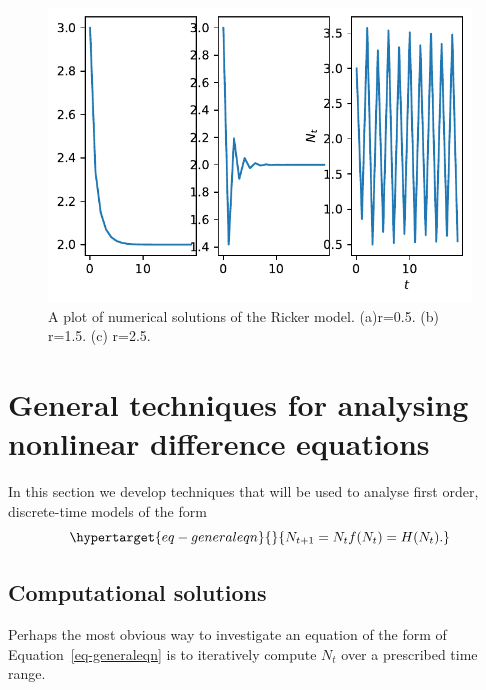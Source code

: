 \documentclass[
  letterpaper,
  DIV=11,
  numbers=noendperiod]{scrreprt}
\begin{document}
\begin{figure}

{\centering \includegraphics{MA32009-SinglePopDiscreteTimea_files/figure-pdf/fig-plotricker-output-1.pdf}

}

\caption{\label{fig-plotricker}A plot of numerical solutions of the
Ricker model. (a)r=0.5. (b) r=1.5. (c) r=2.5.}

\end{figure}

\hypertarget{general-techniques-for-analysing-nonlinear-difference-equations}{%
\section{General techniques for analysing nonlinear difference
equations}\label{general-techniques-for-analysing-nonlinear-difference-equations}}

In this section we develop techniques that will be used to analyse first
order, discrete-time models of the form
\begin{equation}\protect\hypertarget{eq-generaleqn}{}{ 
N_{t+1}=N_t f(N_t)=H(N_t).
}\label{eq-generaleqn}\end{equation}

\hypertarget{computational-solutions-1}{%
\subsection{Computational solutions}\label{computational-solutions-1}}

Perhaps the most obvious way to investigate an equation of the form of
Equation~\ref{eq-generaleqn} is to iteratively compute \(N_t\) over a
prescribed time range.
\end{document}
